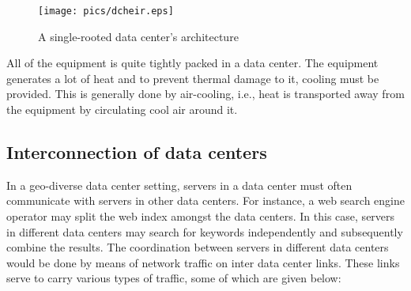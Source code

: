 \begin{figure}
\texttt{[image: pics/dcheir.eps]}
\caption{A single-rooted data center's architecture}
\label{fig:dcheir}
\end{figure}

All of the equipment is quite tightly packed in a data center. The equipment generates a lot of heat and to prevent thermal damage to it, cooling must be provided. This is generally done by air-cooling, i.e., heat is transported away from the equipment by circulating cool air around it.

\subsection{Interconnection of data centers} In a geo-diverse data center setting, servers in a data center must often communicate with servers in other data centers. For instance, a web search engine operator may split the web index amongst the data centers. In this case, servers in different data centers may search for keywords independently and subsequently combine the results. The coordination between servers in different data centers would be done by means of network traffic on inter data center links. These links serve to carry various types of traffic, some of which are given below:
